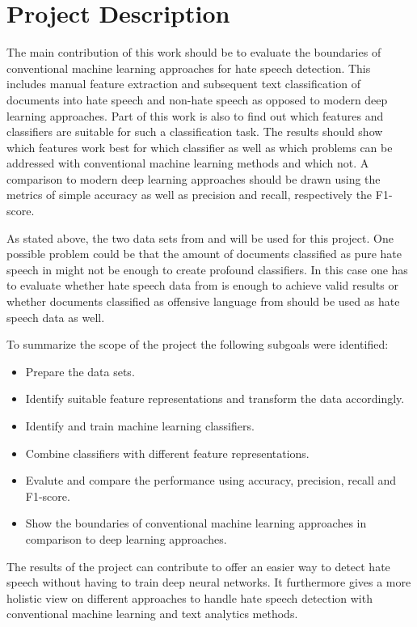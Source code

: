 \section{Project Description}
\label{section:description}

The main contribution of this work should be to evaluate the boundaries of conventional machine learning approaches for hate speech detection. This includes manual feature extraction and subsequent text classification of documents into hate speech and non-hate speech as opposed to modern deep learning approaches. Part of this work is also to find out which features and classifiers are suitable for such a classification task. The results should show which features work best for which classifier as well as which problems can be addressed with conventional machine learning methods and which not. A comparison to modern deep learning approaches should be drawn using the metrics of simple accuracy as well as precision and recall, respectively the F1-score. 

As stated above, the two data sets from \cite{ThomasDavidson.2020} and \cite{OnadeGibert.2020} will be used for this project. One possible problem could be that the amount of documents classified as pure hate speech in \cite{ThomasDavidson.2020} might not be enough to create profound classifiers. In this case one has to evaluate whether hate speech data from \cite{OnadeGibert.2020} is enough to achieve valid results or whether documents classified as offensive language from \cite{ThomasDavidson.2020} should be used as hate speech data as well. 

\vspace{12pt}
To summarize the scope of the project the following subgoals were identified:

\begin{itemize}
	\item Prepare the data sets.
	\item Identify suitable feature representations and transform the data accordingly.
	\item Identify and train machine learning classifiers.
	\item Combine classifiers with different feature representations.
	\item Evalute and compare the performance using accuracy, precision, recall and F1-score.
	\item Show the boundaries of conventional machine learning approaches in comparison to deep learning approaches.
\end{itemize}

The results of the project can contribute to offer an easier way to detect hate speech without having to train deep neural networks. It furthermore gives a more holistic view on different approaches to handle hate speech detection with conventional machine learning and text analytics methods.


